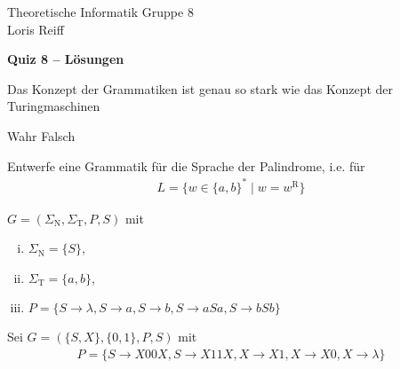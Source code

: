 \documentclass[a4paper,ngerman,12pt]{exam}
\newcommand\ST{\Sigma_{\mathrm{T}}}
\newcommand\SN{\Sigma_{\mathrm{N}}}
\begin{document}
\noindent Theoretische Informatik \hfill Gruppe 8 \\
\mbox{}\hfill Loris Reiff
\begin{center}
  \bfseries\Large
  Quiz 8 \ifprintanswers
  -- Lösungen
\fi
\end{center}

\begin{questions}
  \question
  Das Konzept der Grammatiken ist genau so stark wie das Konzept der Turingmaschinen
  \begin{checkboxes}
    \CorrectChoice Wahr
    \choice Falsch
  \end{checkboxes}

\question Entwerfe eine Grammatik für die Sprache der Palindrome, i.e. für
  \begin{align*}
    L = \{w \in \{a,b\}^* \mid w = w^{\text{R}}\}
  \end{align*}
  \vspace*{-2em}
\begin{solutionorbox}[8em]
  $G = (\SN, \ST, P, S)$ mit
  \begin{enumerate}[(i)]
    \item $\SN = \{S\}$,
    \item $\ST = \{a,b\}$,
    \item $P = \{S \to \lambda, S \to a, S \to b, S \to aSa, S \to bSb\}$
  \end{enumerate}
\end{solutionorbox}

\question Sei
  $G = (\{S,X\}, \{0,1\}, P, S)$ mit
  \begin{align*}
    P = \{S \to X00X, S \to X11X, X \to X1, X \to X0, X \to \lambda\}
  \end{align*}


\end{questions}
\end{document}
